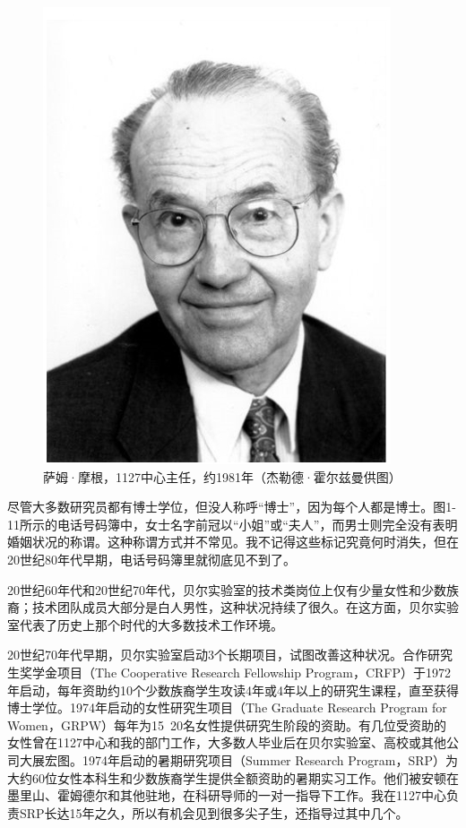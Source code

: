 \documentclass[a4paper,12pt,UTF8,twoside]{ctexbook}
\begin{document}
\begin{figure}[htbp]
	\centering
	\includegraphics[width=0.7\linewidth]{12}
	\caption{萨姆·摩根，1127中心主任，约1981年（杰勒德·霍尔兹曼供图）}
	\label{fig:1}
\end{figure}

尽管大多数研究员都有博士学位，但没人称呼“博士”，因为每个人都是博士。图1-11所示的电话号码簿中，女士名字前冠以“小姐”或“夫人”，而男士则完全没有表明婚姻状况的称谓。这种称谓方式并不常见。我不记得这些标记究竟何时消失，但在20世纪80年代早期，电话号码簿里就彻底见不到了。

20世纪60年代和20世纪70年代，贝尔实验室的技术类岗位上仅有少量女性和少数族裔；技术团队成员大部分是白人男性，这种状况持续了很久。在这方面，贝尔实验室代表了历史上那个时代的大多数技术工作环境。

20世纪70年代早期，贝尔实验室启动3个长期项目，试图改善这种状况。合作研究生奖学金项目（The Cooperative Research Fellowship Program，CRFP）于1972年启动，每年资助约10个少数族裔学生攻读4年或4年以上的研究生课程，直至获得博士学位。1974年启动的女性研究生项目（The Graduate Research Program for Women，GRPW）每年为15~20名女性提供研究生阶段的资助。有几位受资助的女性曾在1127中心和我的部门工作，大多数人毕业后在贝尔实验室、高校或其他公司大展宏图。1974年启动的暑期研究项目（Summer Research Program，SRP）为大约60位女性本科生和少数族裔学生提供全额资助的暑期实习工作。他们被安顿在墨里山、霍姆德尔和其他驻地，在科研导师的一对一指导下工作。我在1127中心负责SRP长达15年之久，所以有机会见到很多尖子生，还指导过其中几个。
\end{document}
